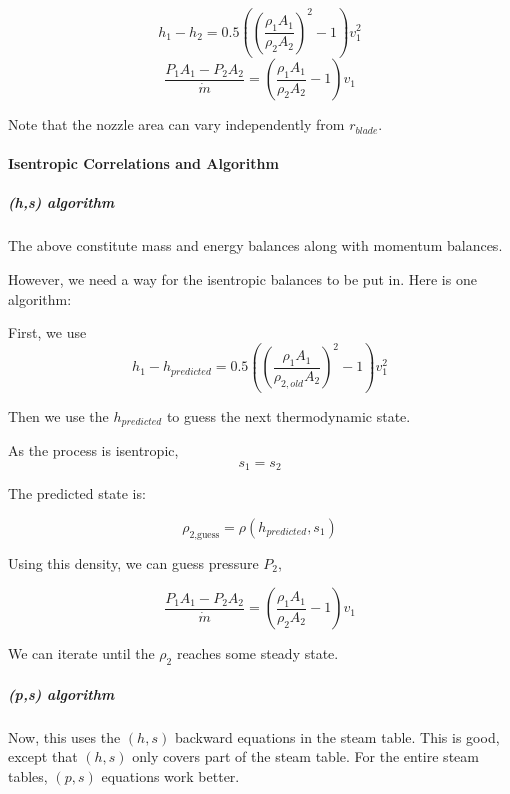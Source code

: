 \documentclass[masters]{ucbthesis}
\renewcommand{\_}{\kern-1.5pt\textunderscore\kern-1.5pt}
\begin{document}
\begin{equation*}
	h_1 - h_2 = 
	0.5 \left( \left(
			\frac{\rho_1 A_1 }{\rho_2 A_2 } 
		\right)^2
	- 1 \right) v_1^2 
\end{equation*}
\begin{equation*}
	\frac{P_1 A_1 - P_2 A_2}{\dot{m}} =  \left( 
		\frac{\rho_1 A_1 }{\rho_2  A_2} - 1
	\right)
	v_1
\end{equation*}

Note that the nozzle area can vary independently from $r_{blade}$.

\paragraph{Isentropic Correlations and Algorithm}

\subparagraph{(h,s) algorithm}
The above constitute mass and energy balances along with momentum balances.

However, we need a way for the isentropic balances to be put in.
Here is one algorithm:

First, we use 
\begin{equation*}
	h_1 - h_{predicted} = 
	0.5 \left( \left(
			\frac{\rho_1 A_1 }{\rho_{2,old} A_2 } 
		\right)^2
	- 1 \right) v_1^2 
\end{equation*}

Then we use the $h_{predicted}$ to guess the next thermodynamic state. 

As the process is isentropic,
\begin{equation*}
	s_1 = s_2
\end{equation*}

The predicted state is:

\begin{equation*}
	\rho_\text{2,guess} = \rho(h_{predicted},s_1)
\end{equation*}

Using this density, we can guess pressure $P_2$, 

\begin{equation*}
	\frac{P_1 A_1 - P_2 A_2}{\dot{m}} =  \left( 
		\frac{\rho_1 A_1 }{\rho_2  A_2} - 1
	\right)
	v_1
\end{equation*}

We can iterate until the $\rho_2$ reaches some steady state.

\subparagraph{(p,s) algorithm}
Now, this uses the $(h,s)$ backward equations in the steam table.
This is good, except that $(h,s)$ only covers part of the steam table.
For the entire steam tables, $(p,s)$ equations work better.
\end{document}
